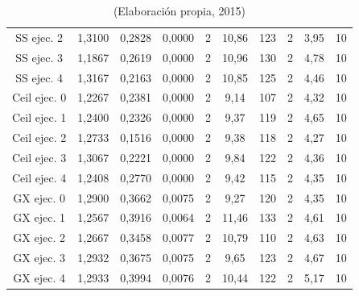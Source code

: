 \begin{table}[hbtp!]
\begin{center}
\begin{tabular}{c|ccc|ccc|ccc}
SS ejec. 2 & 1,3100 & 0,2828 & 0,0000 & 2 & 10,86 & 123 & 2 & 3,95 & 10 \\
SS ejec. 3 & 1,1867 & 0,2619 & 0,0000 & 2 & 10,96 & 130 & 2 & 4,78 & 10 \\
SS ejec. 4 & 1,3167 & 0,2163 & 0,0000 & 2 & 10,85 & 125 & 2 & 4,46 & 10 \\ \hline
Ceil ejec. 0 & 1,2267 & 0,2381 & 0,0000 & 2 & 9,14 & 107 & 2 & 4,32 & 10 \\
Ceil ejec. 1 & 1,2400 & 0,2326 & 0,0000 & 2 & 9,37 & 119 & 2 & 4,65 & 10 \\
Ceil ejec. 2 & 1,2733 & 0,1516 & 0,0000 & 2 & 9,38 & 118 & 2 & 4,27 & 10 \\
Ceil ejec. 3 & 1,3067 & 0,2221 & 0,0000 & 2 & 9,84 & 122 & 2 & 4,36 & 10 \\
Ceil ejec. 4 & 1,2408 & 0,2770 & 0,0000 & 2 & 9,42 & 115 & 2 & 4,35 & 10 \\ \hline
GX ejec. 0 & 1,2900 & 0,3662 & 0,0075 & 2 & 9,27 & 120 & 2 & 4,35 & 10 \\
GX ejec. 1 & 1,2567 & 0,3916 & 0,0064 & 2 & 11,46 & 133 & 2 & 4,61 & 10 \\
GX ejec. 2 & 1,2667 & 0,3458 & 0,0077 & 2 & 10,79 & 110 & 2 & 4,63 & 10 \\
GX ejec. 3 & 1,2932 & 0,3675 & 0,0075 & 2 & 9,65 & 123 & 2 & 4,67 & 10 \\
GX ejec. 4 & 1,2933 & 0,3994 & 0,0076 & 2 & 10,44 & 122 & 2 & 5,17 & 10 \\
\hline
\end{tabular}
\end{center}
\caption*{(Elaboración propia, 2015)}
\end{table}

